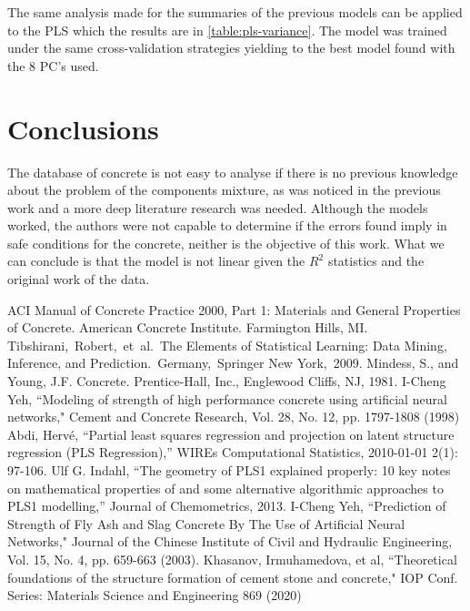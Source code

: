 \documentclass[conference]{IEEEtran}
\begin{document}
The same analysis made for the summaries of the previous models can be applied to the PLS which the results are in \autoref{table:pls-variance}. The model was trained under the same cross-validation strategies yielding to the best model found with the 8 PC's used.

\section{Conclusions}\label{sec:conclusions}

The database of concrete is not easy to analyse if there is no previous knowledge about the problem of the components mixture, as was noticed in the previous work and a more deep literature research was needed. Although the models worked, the authors were not capable to determine if the errors found imply in safe conditions for the concrete, neither is the objective of this work. What we can conclude is that the model is not linear given the $R^2$ statistics and the original work of the data\cite{b4}.

\begin{thebibliography}{00}
 ACI Manual of Concrete Practice 2000, Part 1: Materials and General Properties of Concrete.  American Concrete Institute.  Farmington Hills, MI.
 Tibshirani, Robert, et al. The Elements of  Statistical Learning:  Data Mining, Inference, and Prediction. Germany, Springer New York, 2009.
 Mindess, S., and Young, J.F. Concrete. Prentice-Hall, Inc., Englewood Cliffs, NJ, 1981.
 I-Cheng Yeh, ``Modeling of strength of high performance concrete using artificial neural networks," Cement and Concrete Research, Vol. 28, No. 12, pp. 1797-1808 (1998)
 Abdi, Hervé, ``Partial least squares regression and projection on latent structure regression (PLS Regression),'' WIREs Computational Statistics, 2010-01-01 2(1): 97-106.
 Ulf G. Indahl, ``The geometry of PLS1 explained properly: 10 key notes on mathematical properties of and some alternative algorithmic approaches to PLS1 modelling,'' Journal of Chemometrics, 2013.
 I-Cheng Yeh, ``Prediction of Strength of Fly Ash and Slag Concrete By The Use of Artificial Neural Networks," Journal of the Chinese Institute of Civil and Hydraulic Engineering, Vol. 15, No. 4, pp. 659-663 (2003). 
 Khasanov, Irmuhamedova, et al, ``Theoretical foundations of the structure formation of cement stone
and concrete," IOP Conf. Series: Materials Science and Engineering 869 (2020)
\end{thebibliography}
\end{document}
